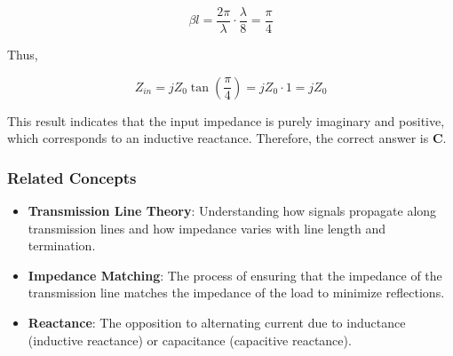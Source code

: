 \[
\beta l = \frac{2\pi}{\lambda} \cdot \frac{\lambda}{8} = \frac{\pi}{4}
\]

Thus,

\[
Z_{in} = j Z_0 \tan\left(\frac{\pi}{4}\right) = j Z_0 \cdot 1 = j Z_0
\]

This result indicates that the input impedance is purely imaginary and positive, which corresponds to an inductive reactance. Therefore, the correct answer is \textbf{C}.

\subsubsection{Related Concepts}
\begin{itemize}
    \item \textbf{Transmission Line Theory}: Understanding how signals propagate along transmission lines and how impedance varies with line length and termination.
    \item \textbf{Impedance Matching}: The process of ensuring that the impedance of the transmission line matches the impedance of the load to minimize reflections.
    \item \textbf{Reactance}: The opposition to alternating current due to inductance (inductive reactance) or capacitance (capacitive reactance).
\end{itemize}

